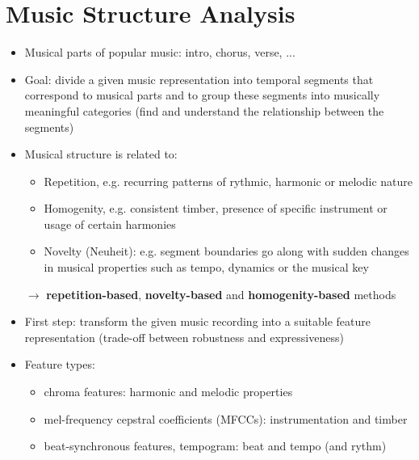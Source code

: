 \documentclass{scrartcl}
\begin{document}
\newpage

\section{Music Structure Analysis}
\begin{itemize}
    \item
        Musical parts of popular music: intro, chorus, verse, ...
    \item
        Goal: divide a given music representation into temporal segments that correspond to musical parts and to group these segments into musically meaningful categories (find and understand the relationship between the segments)
    \item
        Musical structure is related to:
        \begin{itemize}
            \item
                Repetition, e.g. recurring patterns of rythmic, harmonic or melodic nature
            \item
                Homogenity, e.g. consistent timber, presence of specific instrument or usage of certain harmonies
            \item
                Novelty (Neuheit): e.g. segment boundaries go along with sudden changes in musical properties such as tempo, dynamics or the musical key
        \end{itemize}
        $\rightarrow$ \textbf{repetition-based}, \textbf{novelty-based} and \textbf{homogenity-based} methods
    \item
        First step: transform the given music recording into a suitable feature representation (trade-off between robustness and expressiveness)
    \item
        Feature types:
        \begin{itemize}
            \item
                chroma features: harmonic and melodic properties
            \item
                mel-frequency cepstral coefficients (MFCCs): instrumentation and timber
            \item
                beat-synchronous features, tempogram: beat and tempo (and rythm)
        \end{itemize}
\end{itemize}
\end{document}
